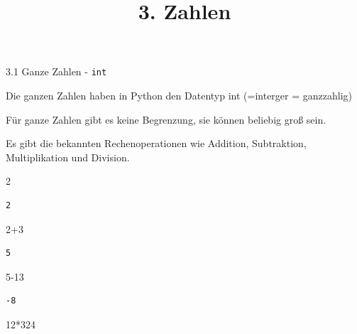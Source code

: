 \documentclass[
  11pt,
  a4paper,
  DIV=11,
  numbers=noendperiod]{scrartcl}
\title{3. Zahlen}
\author{}
\date{}
\makeatletter
\let\oldparagraph\paragraph
\renewcommand{\paragraph}{
    \@ifstar
      \xxxParagraphStar
      \xxxParagraphNoStar
  }
\newcommand{\xxxParagraphStar}[1]{\oldparagraph*{#1}\mbox{}}
\newcommand{\xxxParagraphNoStar}[1]{\oldparagraph{#1}\mbox{}}
\newenvironment{Shaded}{\begin{snugshade}}{\end{snugshade}}
\newcommand{\DecValTok}[1]{\textcolor[rgb]{0.68,0.00,0.00}{#1}}
\newcommand{\OperatorTok}[1]{\textcolor[rgb]{0.37,0.37,0.37}{#1}}
\makeatother
\begin{document}
\maketitle


\paragraph{\texorpdfstring{3.1 Ganze Zahlen -
\texttt{int}}{3.1 Ganze Zahlen - int}}\label{ganze-zahlen---int}

Die ganzen Zahlen haben in Python den Datentyp int (=interger =
ganzzahlig)

Für ganze Zahlen gibt es keine Begrenzung, sie können beliebig groß
sein.

Es gibt die bekannten Rechenoperationen wie Addition, Subtraktion,
Multiplikation und Division.

\begin{Shaded}
\begin{Highlighting}[numbers=left,,]
\DecValTok{2}
\end{Highlighting}
\end{Shaded}

\begin{verbatim}
2
\end{verbatim}

\begin{Shaded}
\begin{Highlighting}[numbers=left,,]
\DecValTok{2}\OperatorTok{+}\DecValTok{3}
\end{Highlighting}
\end{Shaded}

\begin{verbatim}
5
\end{verbatim}

\begin{Shaded}
\begin{Highlighting}[numbers=left,,]
\DecValTok{5}\OperatorTok{{-}}\DecValTok{13}
\end{Highlighting}
\end{Shaded}

\begin{verbatim}
-8
\end{verbatim}

\begin{Shaded}
\begin{Highlighting}[numbers=left,,]
\DecValTok{12}\OperatorTok{*}\DecValTok{324}
\end{Highlighting}
\end{Shaded}
\end{document}
